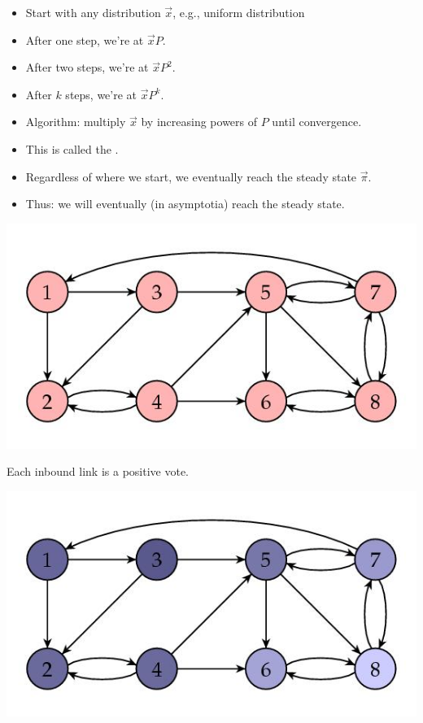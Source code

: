 \documentclass[a4paper,landscape,headrule,footrule,xetex]{foils}
\begin{document}
\begin{itemize}
\item Start with any distribution $\vec{x}$, e.g., uniform distribution
\item After one step, we're at $\vec{x} P$.
\item After two steps, we're at $\vec{x} P^2$.
\item After $k$ steps, we're at $\vec{x} P^k$.
\item Algorithm: multiply $\vec{x}$ by increasing powers of $P$
  until convergence.
\item This is called the .
\item Regardless of where we start, we eventually reach the steady state $\vec{\pi}$.
\item Thus: we will eventually (in asymptotia) reach the steady state.
\end{itemize}

\begin{center}
\includegraphics[height=0.8\textheight]{../pics/goodnet.jpg}  
\end{center}
Each inbound link is a positive vote.


\begin{center}
\includegraphics[height=0.8\textheight]{../pics/goodnet-shaded.jpg}  
\end{center}
\end{document}
